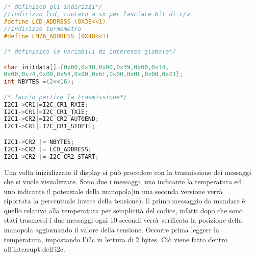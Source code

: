 \documentclass[main.tex]{subfiles}
\begin{document}
\begin{lstlisting}[language=C,caption=Inizio inizializzazione]
/* definisco gli indirizzi*/
//indirizzo lcd, ruotato a sx per lasciare bit di r/w
#define LCD_ADDRESS (0X3E<<1) 
//indirizzo termometro
#define LM76_ADDRESS (0X48<<1) 

/* definisico le variabili di interesse globale*/

char initdata[]={0x00,0x38,0x00,0x39,0x00,0x14,
0x00,0x74,0x00,0x54,0x00,0x6F,0x00,0x0F,0x00,0x01};
int NBYTES =(2<<16);

/* faccio partire la trasmissione*/
I2C1->CR1|=I2C_CR1_RXIE;
I2C1->CR1|=I2C_CR1_TXIE;
I2C1->CR2|=I2C_CR2_AUTOEND;
I2C1->CR1|=I2C_CR1_STOPIE;

I2C1->CR2 |= NBYTES;
I2C1->CR2 |= LCD_ADDRESS;
I2C1->CR2 |= I2C_CR2_START;
\end{lstlisting}

Una volta inizializzato il display si può procedere con la trasmissione dei messaggi che si vuole visualizzare. Sono due i messaggi, uno indicante la temperatura ed uno indicante il potenziale della manopola(in una seconda versione verrà riportata la percentuale invece della tensione). Il primo messaggio da mandare è quello relativo alla temperatura per semplicità del codice, infatti dopo che sono stati trasmessi i due messaggi ogni 10 secondi verrà verificata la posizione della manopola aggiornando il valore della tensione. Occorre prima leggere la temperatura, impostando l'i2c in lettura di 2 bytes. Ciò viene fatto dentro all'interrupt dell'i2c.
\end{document}
